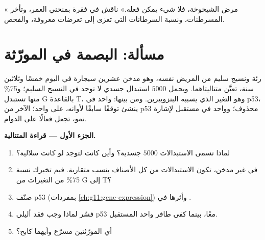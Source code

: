 \begin{exercise}[$\star\star\star$]\label{exo:g11:cancer:15}
« مرض الشيخوخة، فلا شيء يمكن فعله.» ناقش في فقرة بمنحني العمر،
وتأخر المسرطنات، ونسبة السرطانات التي تعزى إلى تعرضات معروفة،
والفحص.
\end{exercise}

\section{مسألة: البصمة في المورّثة}

\begin{problem}
\label{pb:g11:cancer:1}
 رئة ونسيج سليم من المريض نفسه، وهو مدخن عشرين سيجارة في اليوم
خمسًا وثلاثين سنة، تعيَّن متتاليتاهما. ويحمل  $\num{5000}$
استبدال جسدي لا توجد في النسيج السليم؛ و75\% منها تستبدل G بالقاعدة T، وهو
التغير الذي يسببه البنزوبيرين. ومن بينها: واحد في  p53، ينشئ
توقفًا سابقًا لأوانه، على  واحد؛  الآخر من p53 محذوف؛ وواحد
في  مستقبل لإشارة نمو، تجعل  فعالًا على الدوام.

\medskip
\noindent\textbf{الجزء الأول --- قراءة المتتالية.}
\begin{enumerate}
  \item لماذا تسمى الاستبدالات $\num{5000}$ جسدية؟ وأين كانت لتوجد لو
        كانت سلالية؟
  \item في  غير مدخن، تكون الاستبدالات من كل الأصناف بنسب متقاربة.
        فبم تخبرك نسبة 75\% من التغيرات من G إلى T؟
  \item صنّف  p53 (بمفردات \cref{ch:g11:gene-expression}) وأثرها
        في .
  \item فسّر لماذا وجب فقد أليلي p53 معًا، بينما كفى  طافر واحد
         المستقبل.
  \item أي المورّثتين مسرّع وأيهما كابح؟
\end{enumerate}


\end{problem}
